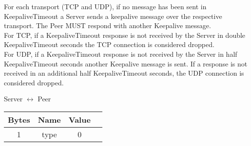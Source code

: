 For each transport (TCP and UDP), if no message has been sent in KeepaliveTimeout a Server sends a keepalive
message over the respective transport. The Peer MUST respond with another Keepalive message.\\

For TCP, if a KeepaliveTimeout response is not received by the Server in
double KeepaliveTimeout seconds the TCP connection is considered dropped.\\

For UDP, if a KeepaliveTimeout response is not received by the Server in
half  KeepaliveTimeout seconds another Keepalive message is sent. If a response is not received in
an additional half KeepaliveTimeout seconds, the UDP connection is considered dropped.

\begin{center}
    Server $\leftrightarrow$ Peer\\
    \begin{tabular}{|c|c|c|c|}
        \hline
        \textbf{Bytes} & \textbf{Name} & \textbf{Value} \\
        \hline
        1              & type          & 0              \\
        \hline
    \end{tabular}
\end{center}